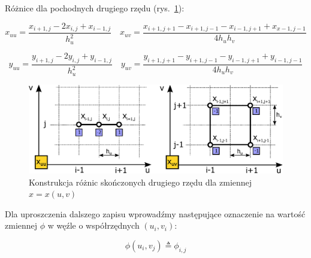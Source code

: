 \noindent Różnice dla pochodnych drugiego rzędu (rys.~\ref{fig:roznice_skonczone_xx}):

\[
x_{uu} = \frac{x_{i+1,j}-2x_{i,j}+x_{i-1,j}}{h_u^2} \quad x_{uv} = \frac{x_{i+1,j+1}-x_{i+1,j-1}-x_{i-1,j+1}+x_{x-1,j-1}}{4h_uh_v}
\]

\[
y_{uu} = \frac{y_{i+1,j}-2y_{i,j}+y_{i-1,j}}{h_u^2} \quad y_{uv} = \frac{y_{i+1,j+1}-y_{i+1,j-1}-y_{i-1,j+1}+y_{i-1,j-1}}{4h_uh_v}
\]


\begin{figure}[H]
	\centering
    \includegraphics[width=\linewidth]{Rysunki/roznice_skonczone_xx.eps}
	\caption{Konstrukcja różnic skończonych drugiego rzędu dla zmiennej $x=x(u,v)$
	\label{fig:roznice_skonczone_xx}}
\end{figure}

\noindent Dla uproszczenia dalszego zapisu wprowadźmy następujące oznaczenie na wartość zmiennej $\phi$ w węźle o współrzędnych $(u_i,v_i)$:

\[
\phi(u_i, v_j) \triangleq \phi_{i,j}
\]

